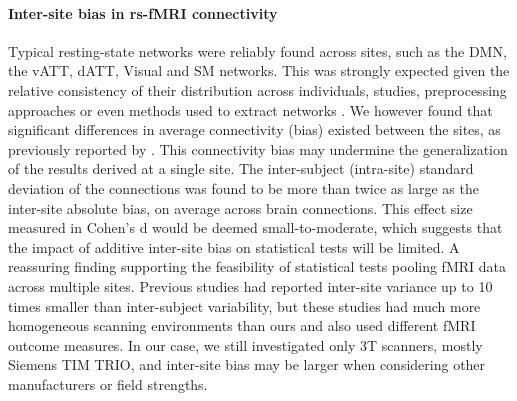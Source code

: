 \documentclass[authoryear]{elsarticle}
\begin{document}
\paragraph{Inter-site bias in rs-fMRI connectivity} Typical resting-state networks were reliably found across sites, such as the DMN, the vATT, dATT, Visual and SM networks. This was strongly expected given the relative consistency of their distribution across individuals, studies, preprocessing approaches or even methods used to extract networks \citep[e.g.][]{Damoiseaux2006,Van_den_Heuvel2008-hq,Bellec2010c,Yeo2011,Power2011}. We however found that significant differences in average connectivity (bias) existed between the sites, as previously reported by \citep{Yan2013a}. This connectivity bias may undermine the generalization of the results derived at a single site. The inter-subject (intra-site) standard deviation of the connections was found to be more than twice as large as the inter-site absolute bias, on average across brain connections. This effect size measured in Cohen's d would be deemed small-to-moderate, which suggests that the impact of additive inter-site bias on statistical tests will be limited. A reassuring finding supporting the feasibility of statistical tests pooling fMRI data across multiple sites. Previous studies \cite{Sutton2008,Brown2011} had reported inter-site variance up to 10 times smaller than inter-subject variability, but these studies had much more homogeneous scanning environments than ours and also used different fMRI outcome measures. In our case, we still investigated only 3T scanners, mostly Siemens TIM TRIO, and inter-site bias may be larger when considering other manufacturers or field strengths.\\

\end{document}
